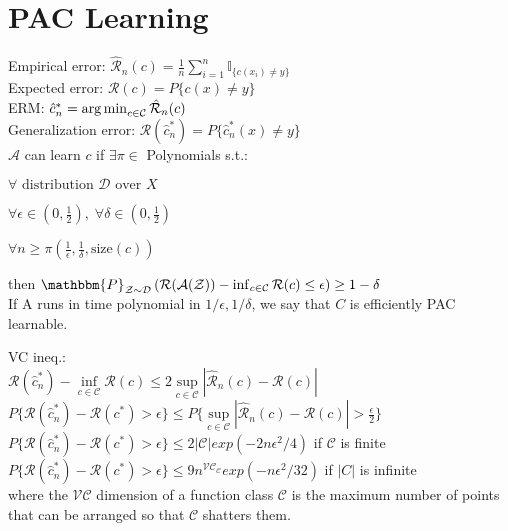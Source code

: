 \section{PAC Learning}
Empirical error: $\hat{\mathcal{R}}_n(c) = \tfrac{1}{n}\sum_{i=1}^n \mathbb{I}_{\{c(x_i)\neq y\}}$ \\
Expected error: $\mathcal{R}(c) = P\{c(x)\neq y\}$ \\
ERM: $\hat{c}_n^* = \operatorname*{arg\,min}_{c\in\mathcal{C}} \hat{\mathcal{R}}_n(c)$ \\
Generalization error: $\mathcal{R}(\hat{c}_n^*) = P\{ \hat{c}_n^*(x)\neq y \}$ \\
$\mathcal{A}$ can learn $c$ if $\exists \pi \in$ Polynomials s.t.:\\
\begin{inparaitem}[\color{red}\textbullet]
    \item $\forall \text{ distribution } \mathcal{D} \text{ over } X$ \\
    \item $\forall \epsilon \in (0, \frac{1}{2}),\;\forall \delta \in (0, \frac{1}{2})$ \\
    \item $\forall n \geq \pi(\frac{1}{\epsilon}, \frac{1}{\delta}, \text{size}(c))$\\
\end{inparaitem}
then $\mathbbm{P}_{\mathcal{Z}\sim\mathcal{D}}\left(\mathcal{R}(\mathcal{A}(\mathcal{Z}))- \inf_{c\in \mathcal{C}}\mathcal{R}(c)\leq \epsilon\right)\geq 1-\delta$\\
If A runs in time polynomial in $1/\epsilon, 1/\delta$, we say that $C$ is efficiently PAC learnable.

VC ineq.:\\ $\mathcal{R}(\hat{c}_n^*) - \inf\limits_{c\in\mathcal{C}}\mathcal{R}(c) \leq 2\sup\limits_{c\in\mathcal{C}}|\hat{\mathcal{R}}_n(c) - \mathcal{R}(c)|$ \\ 
$P\{ \mathcal{R}(\hat{c}_n^*) - \mathcal{R}(c^*) > \epsilon \} \leq P\{ \sup\limits_{c\in\mathcal{C}}|\hat{\mathcal{R}}_n(c) - \mathcal{R}(c)| > \frac{\epsilon}{2} \} $\\
$P\{ \mathcal{R}(\hat{c}_n^*) - \mathcal{R}(c^*) > \epsilon \} \leq 2|\mathcal{C}| exp(-2n\epsilon ^2 /4) $ if $\mathcal{C}$ is finite\\
$P\{ \mathcal{R}(\hat{c}_n^*) - \mathcal{R}(c^*) > \epsilon \}  
\leq 9n^{\mathcal{VC}_{\mathcal{C}}}exp(-n\epsilon ^{2} /32)$ if $|C|$ is infinite\\
where the $\mathcal{VC}$ dimension of a function class $\mathcal{C}$ 
is the maximum number of points that can be arranged so that $\mathcal{C}$ shatters them.
